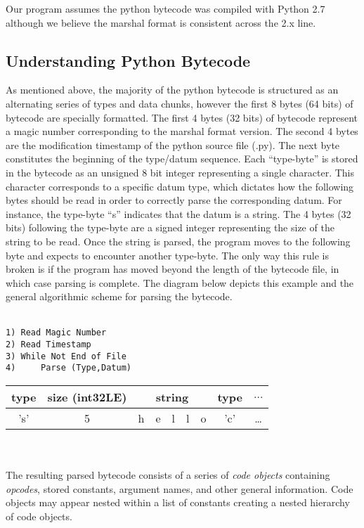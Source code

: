 \documentclass{article}
\begin{document}
Our program assumes the python bytecode was compiled with Python 2.7 although we believe the marshal format is consistent across the 2.x line.

\subsection{Understanding Python Bytecode}

As mentioned above, the majority of the python bytecode is structured as an alternating series of types and data chunks, however the first 8 bytes (64 bits) of bytecode are specially formatted.  The first 4 bytes (32 bits) of bytecode represent a magic number corresponding to the marshal format version.  The second 4 bytes are the modification timestamp of the python source file (.py).  The next byte constitutes the beginning of the type/datum sequence.  Each ``type-byte'' is stored in the bytecode as an unsigned 8 bit integer representing a single character.  This character corresponds to a specific datum type, which dictates how the following bytes should be read in order to correctly parse the corresponding datum.  For instance, the type-byte ``s'' indicates that the datum is a string.  The 4 bytes (32 bits) following the type-byte are a signed integer representing the size of the string to be read.  Once the string is parsed, the program moves to the following byte and expects to encounter another type-byte.  The only way this rule is broken is if the program has moved beyond the length of the bytecode file, in which case parsing is complete.  The diagram below depicts this example and the general algorithmic scheme for parsing the bytecode.\\
\\
\begin{minipage}{\textwidth}
\begin{minipage}{0.35\textwidth}
\begin{verbatim}
1) Read Magic Number
2) Read Timestamp
3) While Not End of File
4)     Parse (Type,Datum)
\end{verbatim}
\end{minipage}
\begin{minipage}{.64\textwidth}
\begin{tabular}{ c | c | c | c | c | c | c | c | c }
type & size (int32LE) & \multicolumn{5}{|c|}{string} & type & $\ldots$ \\ \hline
's' & 5 & h & e & l & l & o & 'c' & \ldots \\ \hline
\end{tabular}
\end{minipage}
\end{minipage}
\\\\
The resulting parsed bytecode consists of a series of {\em code objects} containing {\em opcodes}, stored constants, argument names, and other general information.  Code objects may appear nested within a list of constants creating a nested hierarchy of code objects.
\end{document}
